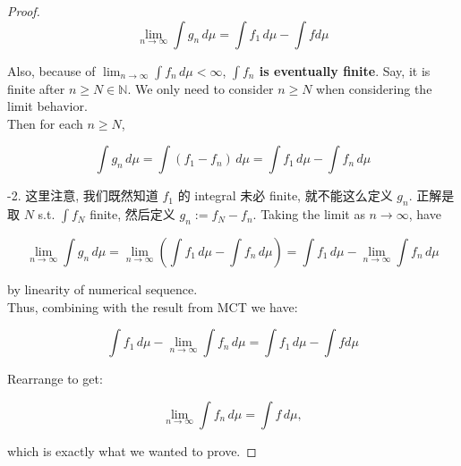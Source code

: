 \begin{proof}
\[\lim\limits_{n\rightarrow\infty}\int g_{n}\, d\mu = \int f_{1}\, d\mu - \int f d\mu\]

Also, because of \(\lim_{n\rightarrow\infty}\int f_{n}\, d\mu < \infty\), \textbf{\(\int f_{n}\) is eventually finite}. Say, it is finite after \(n \geq N \in \mathbb{N}\). We only need to consider \(n \geq N\) when considering the limit behavior.\\
Then for each \(n \geq N\),

\[\int g_{n}\, d\mu = \int(f_{1} - f_{n})\, d\mu = \int f_{1}\, d\mu - \int f_{n}\, d\mu\]

-2. 这里注意, 我们既然知道 \(f_{1}\) 的 integral 未必 finite, 就不能这么定义 \(g_{n}\). 正解是取 \(N\) s.t. \(\int f_{N}\) finite, 然后定义 \(g_{n} := f_{N} - f_{n}\). Taking the limit as \(n\rightarrow\infty\), have

\[\lim\limits_{n\rightarrow\infty}\int g_{n}\, d\mu = \lim\limits_{n\rightarrow\infty}\left( {\int f_{1}\, d\mu - \int f_{n}\, d\mu} \right) = \int f_{1}\, d\mu - \lim\limits_{n\rightarrow\infty}\int f_{n}\, d\mu\]

by linearity of numerical sequence.\\
Thus, combining with the result from MCT we have:

\[\int f_{1}\, d\mu - \lim\limits_{n\rightarrow\infty}\int f_{n}\, d\mu = \int f_{1}\, d\mu - \int f d\mu\]

Rearrange to get:

\[\lim\limits_{n\rightarrow\infty}\int f_{n}\, d\mu = \int f\, d\mu,\]

which is exactly what we wanted to prove.

\end{proof}

